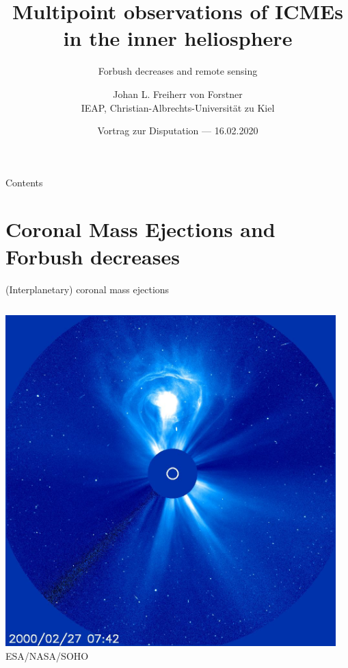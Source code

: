 \documentclass[10pt,aspectratio=169,usenames,dvipsnames]{beamer}
\title{Multipoint observations of ICMEs in the inner heliosphere}
\subtitle{Forbush decreases and remote sensing}
\author{Johan L. Freiherr von Forstner\\IEAP, Christian-Albrechts-Universität zu Kiel}
\date{Vortrag zur Disputation --- 16.02.2020}
\begin{document}
\maketitle

\begin{frame}{Contents}
    \tableofcontents
\end{frame}

\section{Coronal Mass Ejections and Forbush decreases}

\begin{frame}{(Interplanetary) coronal mass ejections}
    \begin{columns}
        \begin{column}{0.45\textwidth}
            \centering
            \includegraphics[width=\textwidth]{images/20000227_0742_c3_1024.jpg}\\
            \scriptsize ESA/NASA/SOHO
        \end{column}
        \begin{column}{0.45\textwidth}
        	\centering
            \vskip2mm

\end{column}
\end{columns}
\end{frame}
\end{document}
